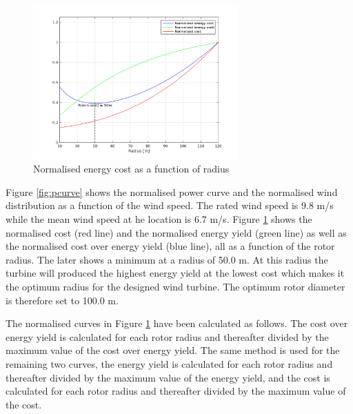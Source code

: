 \begin{figure}[H]
\centering
\includegraphics[width=0.7\textwidth]{Images/optimal_cost.png} 
\caption{Normalised energy cost as a function of radius}\label{fig:costey}
\end{figure}

Figure \ref{fig:pcurve} shows the normalised power curve and the normalised wind distribution as a function of the wind speed. The rated wind speed is 9.8 m/s while the mean wind speed at he location is 6.7 m/s. Figure \ref{fig:costey} shows the normalised cost (red line) and the normalised energy yield (green line) as well as the normalised cost over energy yield (blue line), all as a function of the rotor radius. The later shows a minimum at a radius of 50.0 m. At this radius the turbine will produced the highest energy yield at the lowest cost which makes it the optimum radius for the designed wind turbine. The optimum rotor diameter is therefore set to 100.0 m.

The normalised curves in Figure \ref{fig:costey} have been calculated as follows. The cost over energy yield is calculated for each rotor radius and thereafter divided by the maximum value of the cost over energy yield. The same method is used for the remaining two curves, the energy yield is calculated for each rotor radius and thereafter divided by the maximum value of the energy yield, and the cost is calculated for each rotor radius and thereafter divided by the maximum value of the cost.